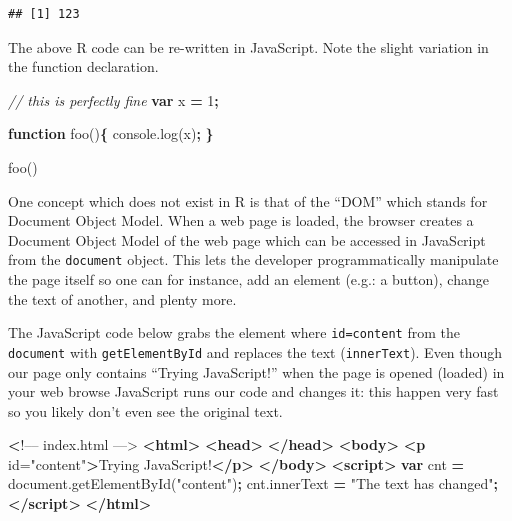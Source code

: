 \documentclass[
]{krantz}
\makeatletter
\newenvironment{Shaded}{\begin{snugshade}}{\end{snugshade}}
\newcommand{\AttributeTok}[1]{\textcolor[rgb]{0.61,0.61,0.61}{#1}}
\newcommand{\CommentTok}[1]{\textcolor[rgb]{0.37,0.37,0.37}{\textit{#1}}}
\newcommand{\DecValTok}[1]{\textcolor[rgb]{0.06,0.06,0.06}{#1}}
\newcommand{\ErrorTok}[1]{\textcolor[rgb]{0.14,0.14,0.14}{\textbf{#1}}}
\newcommand{\KeywordTok}[1]{\textcolor[rgb]{0.27,0.27,0.27}{\textbf{#1}}}
\newcommand{\NormalTok}[1]{#1}
\newcommand{\OperatorTok}[1]{\textcolor[rgb]{0.43,0.43,0.43}{\textbf{#1}}}
\newcommand{\OtherTok}[1]{\textcolor[rgb]{0.37,0.37,0.37}{#1}}
\newcommand{\StringTok}[1]{\textcolor[rgb]{0.5,0.5,0.5}{#1}}
\newcommand{\VariableTok}[1]{\textcolor[rgb]{0,0,0}{#1}}
\newenvironment{kframe}{%
\medskip{}
\setlength{\fboxsep}{.8em}
 \def\at@end@of@kframe{}%
 \ifinner\ifhmode%
  \def\at@end@of@kframe{\end{minipage}}%
  \begin{minipage}{\columnwidth}%
 \fi\fi%
 \def\FrameCommand##1{\hskip\@totalleftmargin \hskip-\fboxsep
 \colorbox{shadecolor}{##1}\hskip-\fboxsep
     \hskip-\linewidth \hskip-\@totalleftmargin \hskip\columnwidth}%
 \MakeFramed {\advance\hsize-\width
   \@totalleftmargin\z@ \linewidth\hsize
   \@setminipage}}%
 {\par\unskip\endMakeFramed%
 \at@end@of@kframe}
\renewenvironment{Shaded}{\begin{kframe}}{\end{kframe}}
\makeatother
\begin{document}
\begin{verbatim}
## [1] 123
\end{verbatim}

The above R code can be re-written in JavaScript. Note the slight variation in the function declaration.

\begin{Shaded}
\begin{Highlighting}[]
\CommentTok{// this is perfectly fine}
\KeywordTok{var}\NormalTok{ x }\OperatorTok{=} \DecValTok{1}\OperatorTok{;}

\KeywordTok{function} \AttributeTok{foo}\NormalTok{()}\OperatorTok{\{}
  \VariableTok{console}\NormalTok{.}\AttributeTok{log}\NormalTok{(x)}\OperatorTok{;} 
\OperatorTok{\}}

\AttributeTok{foo}\NormalTok{()}
\end{Highlighting}
\end{Shaded}

One concept which does not exist in R is that of the ``DOM'' which stands for Document Object Model. When a web page is loaded, the browser creates a Document Object Model of the web page which can be accessed in JavaScript from the \texttt{document} object. This lets the developer programmatically manipulate the page itself so one can for instance, add an element (e.g.: a button), change the text of another, and plenty more.

The JavaScript code below grabs the element where \texttt{id=\textquotesingle{}content\textquotesingle{}} from the \texttt{document} with \texttt{getElementById} and replaces the text (\texttt{innerText}). Even though our page only contains ``Trying JavaScript!'' when the page is opened (loaded) in your web browse JavaScript runs our code and changes it: this happen very fast so you likely don't even see the original text.

\begin{Shaded}
\begin{Highlighting}[]
 \ErrorTok{<}\NormalTok{!–– index.html ––>}
\KeywordTok{<html>}
  \KeywordTok{<head>}
  \KeywordTok{</head>}
  \KeywordTok{<body>}
    \KeywordTok{<p}\OtherTok{ id=}\StringTok{"content"}\KeywordTok{>}\NormalTok{Trying JavaScript!}\KeywordTok{</p>}
  \KeywordTok{</body>}
  \KeywordTok{<script>}
    \KeywordTok{var}\NormalTok{ cnt }\OperatorTok{=} \VariableTok{document}\NormalTok{.}\AttributeTok{getElementById}\NormalTok{(}\StringTok{"content"}\NormalTok{)}\OperatorTok{;}
    \VariableTok{cnt}\NormalTok{.}\AttributeTok{innerText} \OperatorTok{=} \StringTok{"The text has changed"}\OperatorTok{;}
  \KeywordTok{</script>}
\KeywordTok{</html>}
\end{Highlighting}
\end{Shaded}
\end{document}
